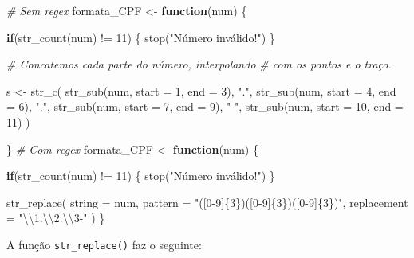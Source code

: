 \documentclass[
]{book}
\newenvironment{Shaded}{\begin{snugshade}}{\end{snugshade}}
\newcommand{\AttributeTok}[1]{\textcolor[rgb]{0.77,0.63,0.00}{#1}}
\newcommand{\CommentTok}[1]{\textcolor[rgb]{0.56,0.35,0.01}{\textit{#1}}}
\newcommand{\ControlFlowTok}[1]{\textcolor[rgb]{0.13,0.29,0.53}{\textbf{#1}}}
\newcommand{\DecValTok}[1]{\textcolor[rgb]{0.00,0.00,0.81}{#1}}
\newcommand{\FunctionTok}[1]{\textcolor[rgb]{0.00,0.00,0.00}{#1}}
\newcommand{\NormalTok}[1]{#1}
\newcommand{\OtherTok}[1]{\textcolor[rgb]{0.56,0.35,0.01}{#1}}
\newcommand{\SpecialCharTok}[1]{\textcolor[rgb]{0.00,0.00,0.00}{#1}}
\newcommand{\StringTok}[1]{\textcolor[rgb]{0.31,0.60,0.02}{#1}}
\begin{document}
\begin{Shaded}
\begin{Highlighting}[]
\CommentTok{\# Sem regex}
\NormalTok{formata\_CPF }\OtherTok{\textless{}{-}} \ControlFlowTok{function}\NormalTok{(num) \{}
  
  \ControlFlowTok{if}\NormalTok{(}\FunctionTok{str\_count}\NormalTok{(num) }\SpecialCharTok{!=} \DecValTok{11}\NormalTok{) \{}
    \FunctionTok{stop}\NormalTok{(}\StringTok{"Número inválido!"}\NormalTok{)}
\NormalTok{  \}}
  
  \CommentTok{\# Concatemos cada parte do número, interpolando}
  \CommentTok{\# com os pontos e o traço.}
  
\NormalTok{  s }\OtherTok{\textless{}{-}} \FunctionTok{str\_c}\NormalTok{(}
    \FunctionTok{str\_sub}\NormalTok{(num, }\AttributeTok{start =} \DecValTok{1}\NormalTok{, }\AttributeTok{end =} \DecValTok{3}\NormalTok{),}
    \StringTok{"."}\NormalTok{,}
    \FunctionTok{str\_sub}\NormalTok{(num, }\AttributeTok{start =} \DecValTok{4}\NormalTok{, }\AttributeTok{end =} \DecValTok{6}\NormalTok{),}
    \StringTok{"."}\NormalTok{,}
    \FunctionTok{str\_sub}\NormalTok{(num, }\AttributeTok{start =} \DecValTok{7}\NormalTok{, }\AttributeTok{end =} \DecValTok{9}\NormalTok{),}
    \StringTok{"{-}"}\NormalTok{,}
    \FunctionTok{str\_sub}\NormalTok{(num, }\AttributeTok{start =} \DecValTok{10}\NormalTok{, }\AttributeTok{end =} \DecValTok{11}\NormalTok{)}
\NormalTok{  )}
  
\NormalTok{\}}
\CommentTok{\# Com regex}
\NormalTok{formata\_CPF }\OtherTok{\textless{}{-}} \ControlFlowTok{function}\NormalTok{(num) \{}
  
  \ControlFlowTok{if}\NormalTok{(}\FunctionTok{str\_count}\NormalTok{(num) }\SpecialCharTok{!=} \DecValTok{11}\NormalTok{) \{}
    \FunctionTok{stop}\NormalTok{(}\StringTok{"Número inválido!"}\NormalTok{)}
\NormalTok{  \}}
  
  \FunctionTok{str\_replace}\NormalTok{(}
    \AttributeTok{string =}\NormalTok{ num, }
    \AttributeTok{pattern =} \StringTok{"([0{-}9]\{3\})([0{-}9]\{3\})([0{-}9]\{3\})"}\NormalTok{, }
    \AttributeTok{replacement =} \StringTok{"}\SpecialCharTok{\textbackslash{}\textbackslash{}}\StringTok{1.}\SpecialCharTok{\textbackslash{}\textbackslash{}}\StringTok{2.}\SpecialCharTok{\textbackslash{}\textbackslash{}}\StringTok{3{-}"}
\NormalTok{  )}
\NormalTok{\}}
\end{Highlighting}
\end{Shaded}

A função \texttt{str\_replace()} faz o seguinte:
\end{document}

